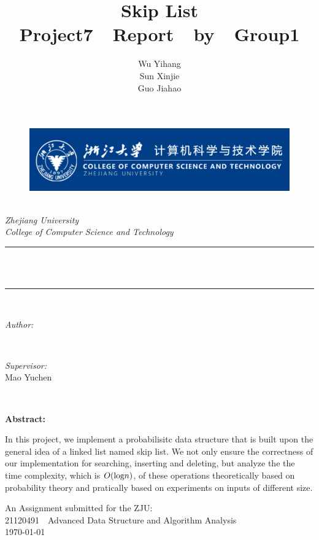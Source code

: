 \documentclass[12pt]{article}
\title{Skip List \\ \bigskip \large Project7\ \ Report\ \ by\ \ Group1}
\author{Wu Yihang \\ Sun Xinjie \\ Guo Jiahao}
\begin{document}
\begin{titlepage}
	\newcommand{\HRule}{\rule{\linewidth}{0.5mm}}
	\begin{figure}
        \flushleft
        \includegraphics[scale=0.4]{0.png}
    \end{figure}
    \center 
	\quad\\[1.5cm]
	\textsl{\Large Zhejiang University }\\[0.5cm] 
	\textsl{\large College of Computer Science and Technology}\\[0.5cm] 
	\makeatletter
	\HRule \\[0.4cm]
	{ \huge \bfseries \@title}\\[0.4cm] 
	\HRule \\[1.5cm]
	\begin{minipage}{0.4\textwidth}
		\begin{flushleft} \Large
			\emph{Author:}\\
			\@author 
		\end{flushleft}
	\end{minipage}
	~
	\begin{minipage}{0.4\textwidth}
		\begin{flushright} \Large
			\emph{Supervisor:} \\
			\textup{Mao Yuchen}
		\end{flushright}
	\end{minipage}\\[2cm]
	\makeatother
	\begin{flushleft}
        \Large
        \textbf{Abstract:}

        \large{In this project, we implement a probabilisitc data structure that is built upon the general idea of a linked list
        named skip list. We not only ensure the correctness of our implementation for searching, inserting and deleting, 
        but analyze the the time complexity, which is $O(\textup{log}n)$, of these operations theoretically based on 
        probability theory and pratically based on experiments on inputs of different size.}
    \end{flushleft}
    
    {\large An Assignment submitted for the ZJU:}\\[0.5cm]
	{\large {21120491\ \ Advanced Data Structure and Algorithm Analysis}}\\[0.5cm]
	{\large \today}\\[2cm] 
	\vfill 
\end{titlepage}
    
\end{document}
